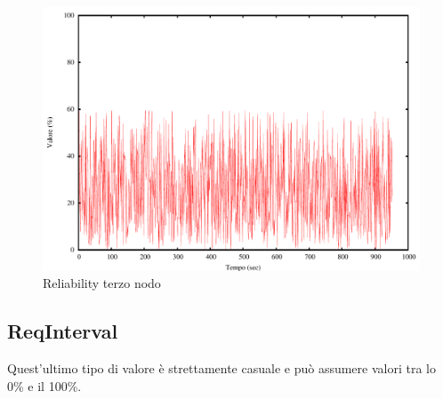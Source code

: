 \begin{figure}[H]
\begin{center}
\includegraphics[scale=0.6]{etc/reliability3.pdf}
\caption{Reliability terzo nodo}
\label{fig:reliability3}
\end{center}
\end{figure}

\subsection{ReqInterval}
Quest'ultimo tipo di valore è strettamente casuale e può assumere valori tra lo 0\% e il 100\%.